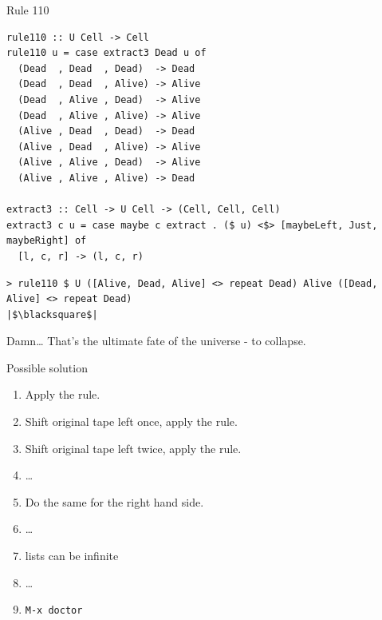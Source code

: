 \documentclass[presentation,aspectratio=169,smaller]{beamer}
\begin{document}
\begin{frame}[label={sec:orge7e19b6},fragile]{Rule 110}
 \begin{verbatim}
rule110 :: U Cell -> Cell
rule110 u = case extract3 Dead u of
  (Dead  , Dead  , Dead)  -> Dead
  (Dead  , Dead  , Alive) -> Alive
  (Dead  , Alive , Dead)  -> Alive
  (Dead  , Alive , Alive) -> Alive
  (Alive , Dead  , Dead)  -> Dead
  (Alive , Dead  , Alive) -> Alive
  (Alive , Alive , Dead)  -> Alive
  (Alive , Alive , Alive) -> Dead

extract3 :: Cell -> U Cell -> (Cell, Cell, Cell)
extract3 c u = case maybe c extract . ($ u) <$> [maybeLeft, Just, maybeRight] of
  [l, c, r] -> (l, c, r)
\end{verbatim}

\pause

\begin{verbatim}
> rule110 $ U ([Alive, Dead, Alive] <> repeat Dead) Alive ([Dead, Alive] <> repeat Dead)
|$\blacksquare$|
\end{verbatim}

\pause

Damn\ldots{} That's the ultimate fate of the universe - to collapse.
\end{frame}

\begin{frame}[label={sec:orgc9f8bdd},fragile]{Possible solution}
 \begin{enumerate}
\item <1-> Apply the rule.
\item <2-> Shift original tape left once, apply the rule.
\item <3-> Shift original tape left twice, apply the rule.
\item <4-> \ldots{}
\item <5-> Do the same for the right hand side.
\item <6-> \ldots{}
\item <7-> lists can be infinite
\item <8-> \ldots{}
\item <9-> \texttt{M-x doctor}
\end{enumerate}
\end{frame}
\end{document}
